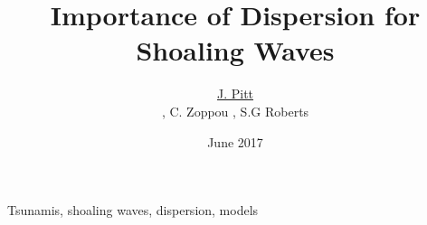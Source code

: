 \documentclass[a4paper,fleqn]{article} %
\begin{document}

\title{Importance of Dispersion for Shoaling Waves}
\author{\underline{J. Pitt} \address[ANU]{\it{Mathematical Sciences Institute, Australian National University, Canberra, ACT 0200, Australia}}, C. Zoppou \addressmark[ANU], S.G Roberts \addressmark[ANU]}



\date{June 2017}

\begin{keyword}
	Tsunamis, shoaling waves, dispersion, models

\end{keyword}
\end{document}
